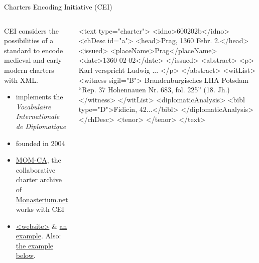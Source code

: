 \begin{frame}[fragile]{Charters Encoding Initiative (CEI)}
\begin{columns}
\begin{block}{CEI}\footnotesize
considers the possibilities of a standard to encode medieval and early
modern charters with XML. 
\begin{itemize}\scriptsize
    \item implements the \emph{Vocabulaire Internationale de Diplomatique} 
    \item founded in 2004
    \item \href{https://www.monasterium.net/mom/home}{MOM-CA}, the collaborative charter archive of \href{https://www.icar-us.eu/en/cooperation/online-portals/monasterium-net/}{Monasterium.net} works with CEI
    \item \href{https://www.cei.lmu.de/}{<website>} \& \href{https://www.cei.lmu.de/examples/PS_Warenkorb.xml}{an example}. Also: \href{http://telota.bbaw.de/constitutiones/data/texts/600202b.xml}{the example below}.
\end{itemize}
\end{block}
\begin{xmlcode}
<text type="charter">
  <idno>600202b</idno>
  <chDesc id="a">
    <head>Prag, 1360 Febr. 2.</head>
      <issued>
         <placeName>Prag</placeName>
         <date>1360-02-02</date>
      </issued>
      <abstract>
         <p> Karl verspricht Ludwig ...
         </p>
      </abstract>
      <witList>
         <witness sigil="B">
            Brandenburgisches LHA Potsdam 
            “Rep. 37 Hohennauen Nr. 683, 
            fol. 225” (18. Jh.)
         </witness>
      </witList>
      <diplomaticAnalysis>
         <bibl type="D">Fidicin, 42...</bibl>
      </diplomaticAnalysis>
   </chDesc> <tenor> </tenor>
</text>
\end{xmlcode}
\end{columns}
\end{frame}




